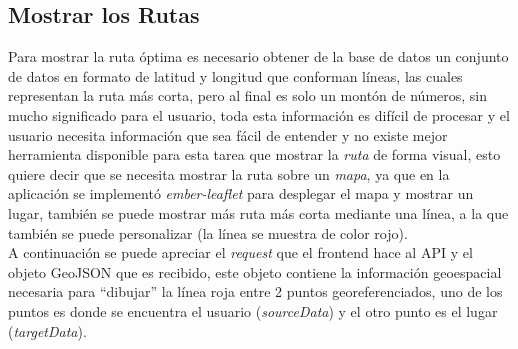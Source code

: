 %
%
%






\subsection{Mostrar los Rutas}
\label{sub:Mostrar los Rutas}

Para mostrar la ruta óptima es necesario obtener de la base de datos un conjunto de datos en formato de latitud y longitud que conforman líneas, las cuales representan la ruta más corta, pero al final es solo un montón de números, sin mucho significado para el usuario, toda esta información es difícil de procesar y el usuario necesita información que sea fácil de entender y no existe mejor herramienta disponible para esta tarea que mostrar la \emph{ruta} de forma visual, esto quiere decir que se necesita mostrar la ruta sobre un \emph{mapa}, ya que en la aplicación se implementó \emph{ember-leaflet} para desplegar el mapa y mostrar un lugar, también se puede  mostrar más ruta más corta mediante una línea, a la que también se puede personalizar (la línea se muestra de color rojo).\\

A continuación se puede apreciar el \emph{request} que el frontend hace al API y  el objeto GeoJSON que es recibido, este objeto contiene la información geoespacial necesaria para ``dibujar'' la línea roja entre 2 puntos georeferenciados, uno de los puntos es donde se encuentra el usuario (\emph{sourceData}) y el otro punto es el lugar (\emph{targetData}).


